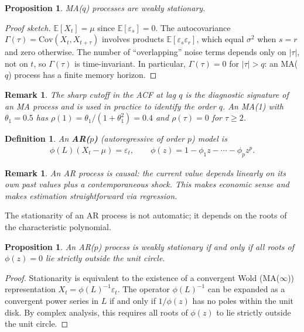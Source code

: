 \documentclass{report}
\theoremstyle{spacedplain}
\newtheorem{proposition}[theorem]{Proposition}
\theoremstyle{spaceddefinition}
\newtheorem{definition}[theorem]{Definition}
\theoremstyle{spacedremark}
\newtheorem{remark}[theorem]{Remark}
\begin{document}
\begin{proposition}
MA($q$) processes are weakly stationary.
\end{proposition}

\begin{proof}[Proof sketch]
$\mathbb{E}[X_t] = \mu$ since $\mathbb{E}[\varepsilon_s] = 0$. The autocovariance $\Gamma(\tau) = \text{Cov}(X_t, X_{t+\tau})$ involves products $\mathbb{E}[\varepsilon_s \varepsilon_r]$, which equal $\sigma^2$ when $s=r$ and zero otherwise. The number of ``overlapping'' noise terms depends only on $|\tau|$, not on $t$, so $\Gamma(\tau)$ is time-invariant. In particular, $\Gamma(\tau) = 0$ for $|\tau| > q$: an MA($q$) process has a finite memory horizon.
\end{proof}

\begin{remark}
The sharp cutoff in the ACF at lag $q$ is the diagnostic signature of an MA process and is used in practice to identify the order $q$. An MA(1) with $\theta_1 = 0.5$ has $\rho(1) = \theta_1/(1+\theta_1^2) = 0.4$ and $\rho(\tau) = 0$ for $\tau \geq 2$.
\end{remark}

\begin{definition}
An \textbf{AR($p$)} (autoregressive of order $p$) model is
\begin{align}
    \phi(L)(X_t - \mu) = \varepsilon_t, \qquad \phi(z) = 1 - \phi_1 z - \cdots - \phi_p z^p.
\end{align}
\end{definition}

\begin{remark}
An AR process is causal: the current value depends linearly on its own past values plus a contemporaneous shock. This makes economic sense and makes estimation straightforward via regression.
\end{remark}

The stationarity of an AR process is not automatic; it depends on the roots of the characteristic polynomial.

\begin{proposition}
An AR($p$) process is weakly stationary if and only if all roots of $\phi(z) = 0$ lie strictly outside the unit circle.
\end{proposition}

\begin{proof}
Stationarity is equivalent to the existence of a convergent Wold (MA($\infty$)) representation $X_t = \phi(L)^{-1}\varepsilon_t$. The operator $\phi(L)^{-1}$ can be expanded as a convergent power series in $L$ if and only if $1/\phi(z)$ has no poles within the unit disk. By complex analysis, this requires all roots of $\phi(z)$ to lie strictly outside the unit circle.
\end{proof}
\end{document}
